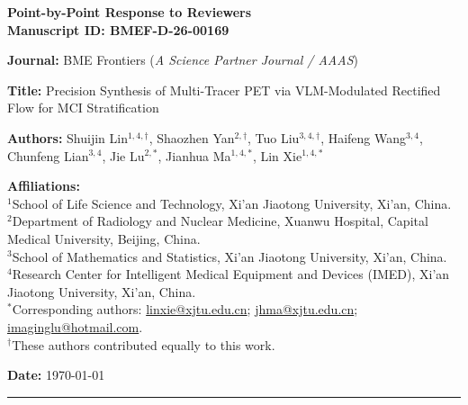 \documentclass[11pt]{article}
\begin{document}
\thispagestyle{empty}

\vspace*{0.8cm}
{\LARGE\bfseries\color{HeaderColor}
  Point-by-Point Response to Reviewers\\[6pt]
  \large\normalfont\color{black}
  Manuscript ID: \textbf{BMEF-D-26-00169}
}

\vspace{0.6cm}
\noindent\textbf{Journal:} BME Frontiers (\textit{A Science Partner Journal / AAAS})

\noindent\textbf{Title:} Precision Synthesis of Multi-Tracer PET via VLM-Modulated Rectified Flow for MCI Stratification

\noindent\textbf{Authors:} Shuijin Lin$^{1,4,\dagger}$, Shaozhen Yan$^{2,\dagger}$, Tuo Liu$^{3,4,\dagger}$, Haifeng Wang$^{3,4}$, Chunfeng Lian$^{3,4}$, Jie Lu$^{2,*}$, Jianhua Ma$^{1,4,*}$, Lin Xie$^{1,4,*}$

\noindent\textbf{Affiliations:}\\
{\small
$^1$School of Life Science and Technology, Xi'an Jiaotong University, Xi'an, China.\\
$^2$Department of Radiology and Nuclear Medicine, Xuanwu Hospital, Capital Medical University, Beijing, China.\\
$^3$School of Mathematics and Statistics, Xi'an Jiaotong University, Xi'an, China.\\
$^4$Research Center for Intelligent Medical Equipment and Devices (IMED), Xi'an Jiaotong University, Xi'an, China.\\
$^*$Corresponding authors: \href{mailto:linxie@xjtu.edu.cn}{linxie@xjtu.edu.cn}; \href{mailto:jhma@xjtu.edu.cn}{jhma@xjtu.edu.cn}; \href{mailto:imaginglu@hotmail.com}{imaginglu@hotmail.com}.\\
$^\dagger$These authors contributed equally to this work.
}

\noindent\textbf{Date:} \today

\vspace{0.8cm}
\noindent\rule{\linewidth}{1.2pt}



\clearpage


\clearpage


\clearpage


\clearpage


\clearpage


\end{document}
